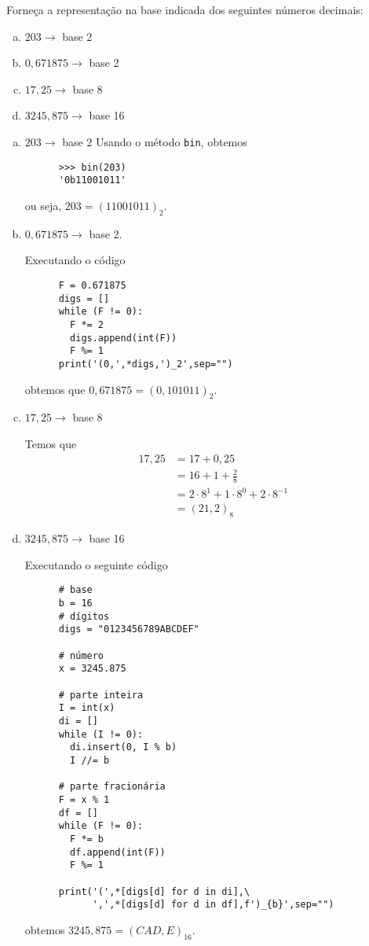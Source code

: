 \begin{exeresol}
  Forneça a representação na base indicada dos seguintes números decimais:
  \begin{enumerate}[a)]
  \item $203 \to$ base 2
  \item $0,671875 \to$ base 2
  \item $17,25 \to$ base 8
  \item $3245,875 \to$ base 16
  \end{enumerate}
\end{exeresol}
\begin{resol}
  \begin{enumerate}[a)]

  \item $203 \to$ base 2
    Usando o método {\python} \lstinline+bin+, obtemos

    \begin{lstlisting}
      >>> bin(203)
      '0b11001011'
    \end{lstlisting}
    ou seja, $203 = (11001011)_2$.

  \item $0,671875 \to$ base 2.

    Executando o código
    \begin{lstlisting}
      F = 0.671875
      digs = []
      while (F != 0):
        F *= 2
        digs.append(int(F))
        F %= 1
      print('(0,',*digs,')_2',sep="")      
    \end{lstlisting}
    obtemos que $0,671875 = (0,101011)_2$.

  \item $17,25 \to$ base 8

    Temos que
    \begin{align}
      17,25 &= 17 + 0,25\\
            &= 16 + 1 + \frac{2}{8}\\
            &= 2\cdot 8^1 + 1\cdot 8^0 + 2\cdot 8^{-1}\\
            &= (21,2)_8
    \end{align}

  \item $3245,875 \to$ base 16

    Executando o seguinte código
    \begin{lstlisting}
      # base
      b = 16
      # dígitos
      digs = "0123456789ABCDEF"

      # número
      x = 3245.875

      # parte inteira 
      I = int(x)
      di = []
      while (I != 0):
        di.insert(0, I % b)
        I //= b

      # parte fracionária
      F = x % 1
      df = []
      while (F != 0):
        F *= b
        df.append(int(F))
        F %= 1

      print('(',*[digs[d] for d in di],\
            ',',*[digs[d] for d in df],f')_{b}',sep="")      
    \end{lstlisting}
    obtemos $3245,875 = (CAD,E)_{16}$.      

  \end{enumerate}
\end{resol}

